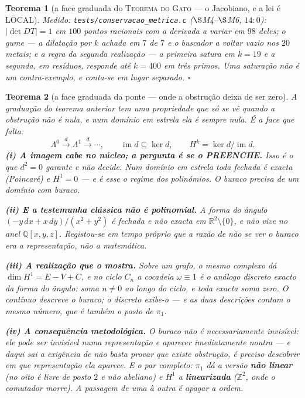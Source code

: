 \documentclass[11pt,a4paper]{article}
\newcommand{\code}[1]{\texttt{\small #1}}
\newtheorem{teorema}{Teorema}
\begin{document}
\begin{teorema}[a face graduada do \textsc{Teorema do Gato} --- o
Jacobiano, e a lei é LOCAL]
\emph{Medido:} \code{tests/conservacao\_metrica.c} ($\S$M4--$\S$M6,
$14{:}0$): $|\det DT|=1$ em $100$ pontos racionais com a derivada a
variar em $98$ deles; o gume --- a dilatação por $k$ achada em $7$ de
$7$ e o buscador a voltar vazio nos $20$ metais; e a regra da segunda
realização --- a primeira satura em $k=19$ e a segunda, em resíduos,
responde até $k=400$ em três primos. Uma saturação não é um
contra-exemplo, e conta-se em lugar separado. $\square$
\end{teorema}

\begin{teorema}[a face graduada da ponte --- onde a obstrução deixa de ser
zero]\label{thm:ponte-graduada}
A graduação do teorema anterior tem uma propriedade que só se vê quando
a obstrução \emph{não} é nula, e num domínio em estrela ela é sempre
nula. É a face que falta:
\[
\Lambda^{0}\xrightarrow{\;d\;}\Lambda^{1}\xrightarrow{\;d\;}\cdots,
\qquad
\operatorname{im}d\subseteq\ker d,
\qquad
H^{k}=\ker d/\operatorname{im}d .
\]
\textbf{(i) A imagem cabe no núcleo; a pergunta é se o PREENCHE.} Isso é
o que $d^{2}=0$ garante e não decide. Num domínio em estrela toda
fechada é exacta (Poincaré) e $H^{1}=0$ --- e é esse o regime dos
polinómios. O buraco precisa de um domínio com buraco.

\textbf{(ii) E a testemunha clássica não é polinomial.} A forma do
ângulo $(-y\,dx+x\,dy)/(x^{2}+y^{2})$ é fechada e não exacta em
$\mathbb{R}^{2}\setminus\{0\}$, e não vive no anel $\mathbb{Q}[x,y,z]$.
Registou-se em tempo próprio que \emph{a razão de não se ver o buraco
era a representação, não a matemática}.

\textbf{(iii) A realização que o mostra.} Sobre um grafo, o mesmo
complexo dá $\dim H^{1}=E-V+C$, e no ciclo $C_{n}$ a cocadeia
$\omega\equiv1$ é o análogo discreto exacto da forma do ângulo: soma
$n\neq0$ ao longo do ciclo, e toda exacta soma zero. \emph{O contínuo
descreve o buraco; o discreto exibe-o} --- e as duas descrições contam o
mesmo número, que é também o posto de $\pi_{1}$.

\textbf{(iv) A consequência metodológica.} \emph{O buraco não é
necessariamente invisível: ele pode ser invisível numa representação e
aparecer imediatamente noutra} --- e daqui sai a exigência de não basta
provar que existe obstrução, é preciso descobrir \emph{em que
representação} ela aparece. E o par completo: $\pi_1$ dá a versão
\textbf{não linear} (no oito é livre de posto $2$ e não abeliano) e
$H^1$ a \textbf{linearizada} ($\mathbb{Z}^2$, onde o comutador morre).
A passagem de uma à outra é apagar a \emph{ordem}.


\end{teorema}
\end{document}

